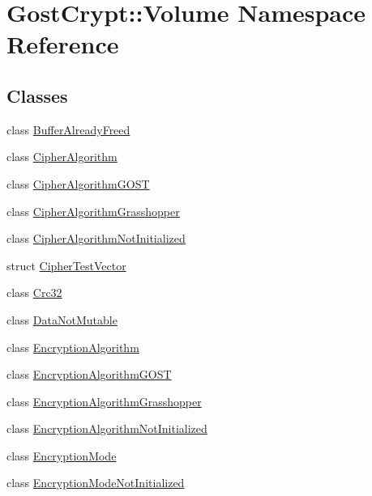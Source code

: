 \hypertarget{namespace_gost_crypt_1_1_volume}{}\section{Gost\+Crypt\+:\+:Volume Namespace Reference}
\label{namespace_gost_crypt_1_1_volume}
\subsection*{Classes}
\begin{DoxyCompactItemize}
\item 
class \hyperlink{class_gost_crypt_1_1_volume_1_1_buffer_already_freed}{Buffer\+Already\+Freed}
\item 
class \hyperlink{class_gost_crypt_1_1_volume_1_1_cipher_algorithm}{Cipher\+Algorithm}
\item 
class \hyperlink{class_gost_crypt_1_1_volume_1_1_cipher_algorithm_g_o_s_t}{Cipher\+Algorithm\+G\+O\+ST}
\item 
class \hyperlink{class_gost_crypt_1_1_volume_1_1_cipher_algorithm_grasshopper}{Cipher\+Algorithm\+Grasshopper}
\item 
class \hyperlink{class_gost_crypt_1_1_volume_1_1_cipher_algorithm_not_initialized}{Cipher\+Algorithm\+Not\+Initialized}
\item 
struct \hyperlink{struct_gost_crypt_1_1_volume_1_1_cipher_test_vector}{Cipher\+Test\+Vector}
\item 
class \hyperlink{class_gost_crypt_1_1_volume_1_1_crc32}{Crc32}
\item 
class \hyperlink{class_gost_crypt_1_1_volume_1_1_data_not_mutable}{Data\+Not\+Mutable}
\item 
class \hyperlink{class_gost_crypt_1_1_volume_1_1_encryption_algorithm}{Encryption\+Algorithm}
\item 
class \hyperlink{class_gost_crypt_1_1_volume_1_1_encryption_algorithm_g_o_s_t}{Encryption\+Algorithm\+G\+O\+ST}
\item 
class \hyperlink{class_gost_crypt_1_1_volume_1_1_encryption_algorithm_grasshopper}{Encryption\+Algorithm\+Grasshopper}
\item 
class \hyperlink{class_gost_crypt_1_1_volume_1_1_encryption_algorithm_not_initialized}{Encryption\+Algorithm\+Not\+Initialized}
\item 
class \hyperlink{class_gost_crypt_1_1_volume_1_1_encryption_mode}{Encryption\+Mode}
\item 
class \hyperlink{class_gost_crypt_1_1_volume_1_1_encryption_mode_not_initialized}{Encryption\+Mode\+Not\+Initialized}

\end{DoxyCompactItemize}
